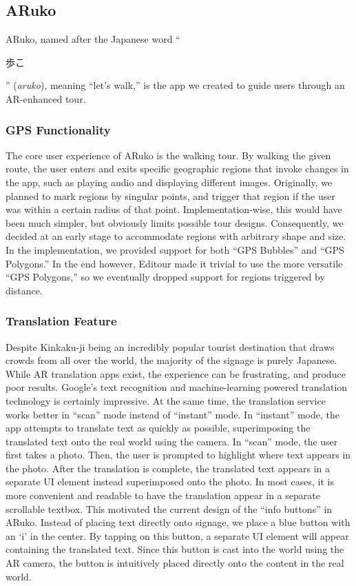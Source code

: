\documentclass[a4paper, 10pt, american, titlepage]{article}
\begin{document}
\subsection{ARuko}
\label{sec:aruko}

ARuko, named after the Japanese word ``\begin{CJK}{UTF8}{min}歩こ\end{CJK}''
(\textit{aruko}), meaning ``let's walk,'' is the app we created to guide users
through an AR-enhanced tour.

\subsubsection{GPS Functionality}
\label{sec:gpsFunctionality}

The core user experience of ARuko is the walking tour. By walking the given
route, the user enters and exits specific geographic regions that invoke
changes in the app, such as playing audio and displaying different images.
Originally, we planned to mark regions by singular points, and trigger that
region if the user was within a certain radius of that point.
Implementation-wise, this would have been much simpler, but obviously limits
possible tour designs. Consequently, we decided at an early stage to
accommodate regions with arbitrary shape and size.  In the implementation, we
provided support for both ``GPS Bubbles'' and ``GPS Polygons.'' In the end
however, Editour made it trivial to use the more versatile ``GPS Polygons,'' so
we eventually dropped support for regions triggered by distance.

\subsubsection{Translation Feature}
\label{sec:translationFeature}

Despite Kinkaku-ji being an incredibly popular tourist destination that draws
crowds from all over the world, the majority of the signage is purely Japanese.
While AR translation apps exist, the experience can be frustrating, and produce
poor results. Google's text recognition and machine-learning powered
translation technology is certainly impressive. At the same time, the
translation service works better in ``scan'' mode instead of ``instant'' mode.
In ``instant'' mode, the app attempts to translate text as quickly as possible,
superimposing the translated text onto the real world using the camera. In
``scan'' mode, the user first takes a photo. Then, the user is prompted to
highlight where text appears in the photo. After the translation is complete,
the translated text appears in a separate UI element instead superimposed onto
the photo. In most cases, it is more convenient and readable to have the
translation appear in a separate scrollable textbox. This motivated the current
design of the ``info buttons'' in ARuko. Instead of placing text directly onto
signage, we place a blue button with an `i' in the center. By tapping on this
button, a separate UI element will appear containing the translated text. Since
this button is cast into the world using the AR camera, the button is
intuitively placed directly onto the content in the real world.
\end{document}
